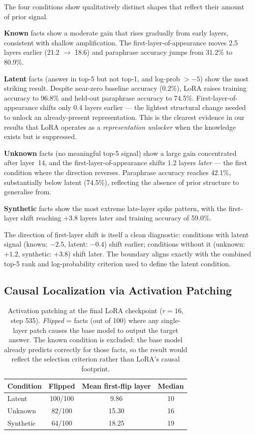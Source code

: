 \documentclass[11pt]{article}
\begin{document}
The four conditions show qualitatively distinct shapes that reflect their
amount of prior signal.

\textbf{Known} facts show a moderate gain that rises gradually from early layers, consistent with shallow amplification.
The first-layer-of-appearance moves 2.5 layers earlier (21.2 $\to$ 18.6) and
paraphrase accuracy jumps from 31.2\% to 80.9\%.

\textbf{Latent} facts (answer in top-5 but not top-1, and log-prob $> -5$)
show the most striking result.
Despite near-zero baseline accuracy (0.2\%), LoRA raises training accuracy to
96.8\% and held-out paraphrase accuracy to 74.5\%.
First-layer-of-appearance shifts only 0.4 layers earlier --- the lightest
structural change needed to unlock an already-present representation.
This is the clearest evidence in our results that LoRA operates as a
\emph{representation unlocker} when the knowledge exists but is suppressed.

\textbf{Unknown} facts (no meaningful top-5 signal) show a large gain
concentrated after layer~14, and the first-layer-of-appearance shifts 1.2
layers \emph{later} --- the first condition where the direction reverses.
Paraphrase accuracy reaches 42.1\%, substantially below latent (74.5\%),
reflecting the absence of prior structure to generalise from.

\textbf{Synthetic} facts show the most extreme late-layer spike pattern, with the
first-layer shift reaching $+3.8$ layers later and training accuracy of 59.0\%.

The direction of first-layer shift is itself a clean diagnostic:
conditions with latent signal (known: $-2.5$, latent: $-0.4$) shift earlier;
conditions without it (unknown: $+1.2$, synthetic: $+3.8$) shift later.
The boundary aligns exactly with the combined top-5 rank and log-probability
criterion used to define the latent condition.

\subsection{Causal Localization via Activation Patching}
\label{sec:patching}

\begin{table}[t]
\centering\small
\caption{Activation patching at the final LoRA checkpoint ($r=16$, step 535).
\emph{Flipped} = facts (out of 100) where any single-layer patch causes the
base model to output the target answer.
The known condition is excluded: the base model already predicts correctly for
those facts, so the result would reflect the selection criterion rather than
LoRA's causal footprint.}
\label{tab:patching}
\begin{tabular}{lccc}
\toprule
\textbf{Condition} & \textbf{Flipped} & \textbf{Mean first-flip layer} & \textbf{Median} \\
\midrule
Latent    & 100/100 &  9.86 & 10 \\
Unknown   &  82/100 & 15.30 & 16 \\
Synthetic &  64/100 & 18.25 & 19 \\
\bottomrule
\end{tabular}
\end{table}
\end{document}
